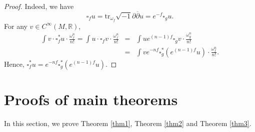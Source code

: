 \documentclass[12pt]{amsart}
\theoremstyle{plain}
\theoremstyle{definition}
\newcommand{\sq}{\sqrt{-1}}
\newcommand{\p}{\partial}
\renewcommand{\bar}{\overline}
\newcommand{\beq}{\begin{equation}}
\newcommand{\eeq}{\end{equation}}
\newcommand{\ee}{\end{eqnarray*}}
\newcommand{\be}{\begin{eqnarray*}}
\renewcommand{\>}{\rightarrow}
\newcommand{\R}{{\mathbb R}}
\renewcommand{\#}{\sharp}
\numberwithin{equation}{section} %
\begin{document}
    \begin{proof} Indeed, we have
        \beq
        \square_fu=\mathrm{tr}_{\omega_f}\sq\p\bar\p u=e^{-f}\square_g u.
        \eeq
        For any $v\in C^\infty(M,\R)$,
        \be
        \int v\cdot \square_f^*u\cdot\frac{\omega_f^n}{n!}=\int u \cdot \square_f v\cdot\frac{\omega_f^n}{n!}
        &=&\int ue^{(n-1)f} \square_g v\cdot\frac{\omega_g^n}{n!}\\
        &=&\int ve^{-nf}\square_g^*(e^{(n-1)f}u)\cdot\frac{\omega_f^n}{n!}.
        \ee
    Hence, $\square_f^*u=e^{-nf}\square_g^*(e^{(n-1)f}u)$.  \end{proof}



\baselineskip

    \section{Proofs of main theorems}
    In this section, we prove Theorem \ref{thm1}, Theorem \ref{thm2} and Theorem \ref{thm3}.
\end{document}
